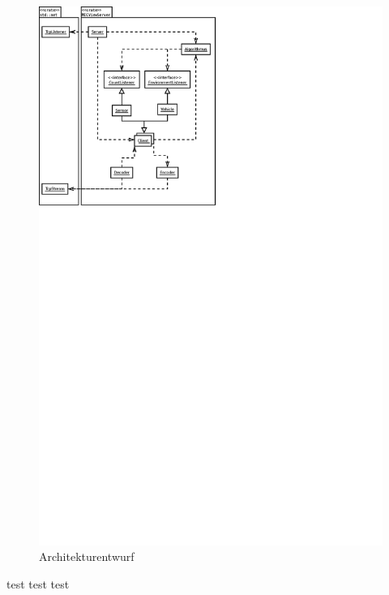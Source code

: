 \documentclass[
	12pt,
	table,
	bigheadings,
	ngerman,
	a4paper,
	BCOR5mm,
	DIV14,
	1.1headlines,
	pagesize,
	oneside,
	openright,
	titlepage,
	headsepline,
	nochapterprefix,
	bibtotoc,
	tocindent,
	listsindent,
	pointlessnumbers,
	cleardoubleempty,
	fleqn,
	halfparskip
]{scrbook}
\begin{document}
		\begin{figure}[H]
			\centering
			\includegraphics[width=1.5\textwidth]{dia/architecture}
			\caption{Architekturentwurf}
			\label{draft:architecture}
		\end{figure}
		
		test test test
		
\end{document}
